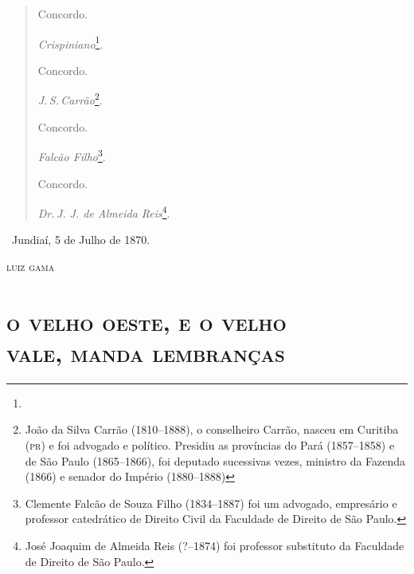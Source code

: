\begin{quote}
Concordo.

\qquad\emph{Crispiniano}\footnote{}.\bigskip

Concordo.

\qquad\emph{J.\,S.\,Carrão}\footnote{João da Silva Carrão (1810--1888), o
  conselheiro Carrão, nasceu em Curitiba (\textsc{pr}) e foi advogado e político.
  Presidiu as províncias do Pará (1857--1858) e de São Paulo (1865--1866),
  foi deputado sucessivas vezes, ministro da Fazenda (1866) e senador do
  Império (1880--1888)}.\bigskip

Concordo.

\qquad\emph{Falcão Filho}\footnote{Clemente Falcão de Souza Filho
  (1834--1887) foi um advogado, empresário e professor catedrático de
  Direito Civil da Faculdade de Direito de São Paulo.}.\bigskip

Concordo.

\qquad\emph{Dr.\,J. J. de Almeida Reis}\footnote{José Joaquim de Almeida Reis
  (?--1874) foi professor substituto da Faculdade de Direito de São
  Paulo.}.
\end{quote}

\hfill\ Jundiaí, 5 de Julho de 1870.\smallskip

\hfill\textsc{luiz gama}

\pagebreak

\begingroup\makeatletter\@openrightfalse
\part[O velho oeste, e o velho vale, manda lembranças]{\textsc{o velho oeste, e o velho\\ vale, manda lembranças}}

\mbox{}\vfill
\thispagestyle{empty}

